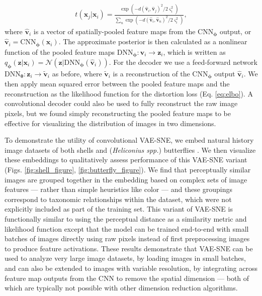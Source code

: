 \documentclass[11pt,a4paper,oneside]{book}
\begin{document}
\begin{appendices}
\begin{align}
t(\mathbf{x}_j | \mathbf{x}_i) = \frac{\exp \left(-d(\hat{\mathbf{v}}_i, \hat{\mathbf{v}}_j)^2 / 2 \varsigma_i^{2}\right)}{\sum_{n} \exp \left(-d(\hat{\mathbf{v}}_i, \hat{\mathbf{v}}_n)^2 / 2 \varsigma_i^{2}\right)},
\end{align}
where $\hat{\mathbf{v}}_i$ is a vector of spatially-pooled feature maps from the $\mathrm{CNN}_{\boldsymbol{\phi}}$ output, or $\hat{\mathbf{v}}_i = \mathrm{CNN}_{\boldsymbol{\phi}}(\mathbf{x}_i)$.
The approximate posterior is then calculated as a nonlinear function of the pooled feature maps $\mathrm{DNN}_{\boldsymbol{\phi}}: \hat{\mathbf{v}}_i \to \mathbf{z}_i$, which is written as    $q_{\boldsymbol{\phi}}(\mathbf{z} | \mathbf{x}_i) = \mathcal{N}(\mathbf{z} | \mathrm{DNN}_{\boldsymbol{\phi}}(\hat{\mathbf{v}}_i))$.
For the decoder we use a feed-forward network $\mathrm{DNN}_{\boldsymbol{\theta}}: \mathbf{z}_i \to \mathbf{\tilde{v}}_i$ as before, where $\mathbf{\tilde{v}}_i$ is a reconstruction of the $\mathrm{CNN}_{\boldsymbol{\phi}}$ output $\hat{\mathbf{v}}_i$. We then apply mean squared error between the pooled feature maps and the reconstruction as the likelihood function for the distortion loss (Eq. \ref{eq:elbo}). A convolutional decoder could also be used to fully reconstruct the raw image pixels, but we found simply reconstructing the pooled feature maps to be effective for visualizing the distribution of images in two dimensions.

To demonstrate the utility of convolutional VAE-SNE, we embed natural history image datasets of both shells \citep{zhang2019shell} and (\textit{Heliconius spp.}) butterflies \citep{cuthill2019deep}. We then visualize these embeddings to qualitatively assess performance of this VAE-SNE variant (Figs. \ref{fig:shell_figure}, \ref{fig:butterfly_figure}). We find that perceptually similar images are grouped together in the embedding based on complex sets of image features --- rather than simple heuristics like color --- and these groupings correspond to taxonomic relationships within the dataset, which were not explicitly included as part of the training set. This variant of VAE-SNE is functionally similar to using the perceptual distance \citep{johnson2016perceptual, wham2019measuring} as a similarity metric and likelihood function except that the model can be trained end-to-end with small batches of images directly using raw pixels instead of first preprocessing images to produce feature activations. These results demonstrate that VAE-SNE can be used to analyze very large image datasets, by loading images in small batches, and can also be extended to images with variable resolution, by integrating across feature map outputs from the CNN to remove the spatial dimension --- both of which are typically not possible with other dimension reduction algorithms. 


\end{appendices}
\end{document}
